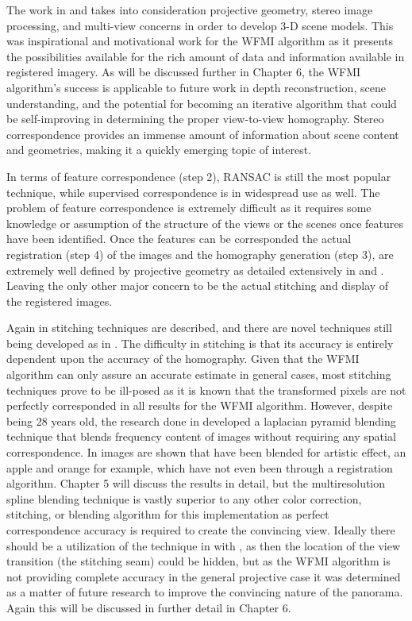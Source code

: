   The work in \cite{Walli2009} and \cite{Nilosek2009} takes into consideration projective geometry, stereo image processing, and multi-view concerns in order to develop 3-D scene models. This was inspirational and motivational work for the WFMI algorithm as it presents the possibilities available for the rich amount of data and information available in registered imagery. As will be discussed further in Chapter 6, the WFMI algorithm's success is applicable to future work in depth reconstruction, scene understanding, and the potential for becoming an iterative algorithm that could be self-improving in determining the proper view-to-view homography. Stereo correspondence provides an immense amount of information about scene content and geometries, making it a quickly emerging topic of interest.
  
  In terms of feature correspondence (step 2), RANSAC \cite{Brown2007} is still the most popular technique, while supervised correspondence is in widespread use as well. The problem of feature correspondence is extremely difficult as it requires some knowledge or assumption of the structure of the views or the scenes once features have been identified. Once the features can be corresponded the actual  registration (step 4) of the images and the homography generation (step 3), are extremely well defined by projective geometry as detailed extensively in \cite{Faugeras2004} and \cite{Hartley2003}. Leaving the only other major concern to be the actual stitching and display of the registered images.
  
   Again in \cite{Zitova2003} stitching techniques are described, and there are novel techniques still being developed as in \cite{Haenselmann2009}. The difficulty in stitching is that its accuracy is entirely dependent upon the accuracy of the homography. Given that the WFMI algorithm can only assure an accurate estimate in general cases, most stitching techniques prove to be ill-posed as it is known that the transformed pixels are not perfectly corresponded in all results for the WFMI algorithm. However, despite being 28 years old, the research done in \cite{Burt1983} developed a laplacian pyramid blending technique that blends frequency content of images without requiring any spatial correspondence. In \cite{Burt1983} images are shown that have been blended for artistic effect, an apple and orange for example, which have not even been through a registration algorithm. Chapter 5 will discuss the results in detail, but the multiresolution spline blending technique is vastly superior to any other color correction, stitching, or blending algorithm for this implementation as perfect correspondence accuracy is required to create the convincing view. Ideally there should be a utilization of the technique in \cite{Haenselmann2009} with \cite{Burt1983}, as then the location of the view transition (the stitching seam) could be hidden, but as the WFMI algorithm is not providing complete accuracy in the general projective case it was determined as a matter of future research to improve the convincing nature of the panorama. Again this will be discussed in further detail in Chapter 6.

